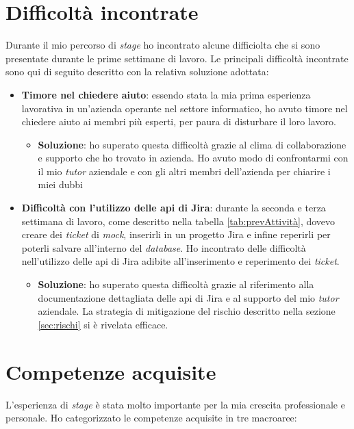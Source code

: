 \section{Difficoltà incontrate}
Durante il mio percorso di \textit{stage} ho incontrato alcune difficiolta che si sono presentate durante le prime settimane di lavoro. Le principali difficoltà incontrate sono qui di seguito descritto con la relativa soluzione adottata:
\begin{itemize}
    \item \textbf{Timore nel chiedere aiuto}: essendo stata la mia prima esperienza lavorativa in un'azienda operante nel settore informatico, ho avuto timore nel chiedere aiuto ai membri più esperti, per paura di disturbare il loro lavoro. 
        \begin{itemize} 
        \item \textbf{Soluzione}: ho superato questa difficoltà grazie al clima di collaborazione e supporto che ho trovato in azienda. Ho avuto modo di confrontarmi con il mio \textit{tutor} aziendale e con gli altri membri dell'azienda per chiarire i miei dubbi
        \end{itemize}
    \item \textbf{Difficoltà con l'utilizzo delle \gls{api} di Jira}: durante la seconda e terza settimana di lavoro, come descritto nella tabella \ref{tab:prevAttività}, dovevo creare dei \textit{ticket} di \textit{mock}, inserirli in un progetto Jira e infine reperirli per poterli salvare all'interno del \textit{database}. Ho incontrato delle difficoltà nell'utilizzo delle \gls{api} di Jira adibite all'inserimento e reperimento dei \textit{ticket}. \begin{itemize} \item \textbf{Soluzione}: ho superato questa difficoltà grazie al riferimento alla documentazione dettagliata delle \gls{api} di Jira e al supporto del mio \textit{tutor} aziendale. La strategia di mitigazione del rischio descritto nella sezione \ref{sec:rischi} si è rivelata efficace. \end{itemize}
\end{itemize}

\section{Competenze acquisite}
L'esperienza di \textit{stage} è stata molto importante per la mia crescita professionale e personale. Ho categorizzato le competenze acquisite in tre macroaree:

